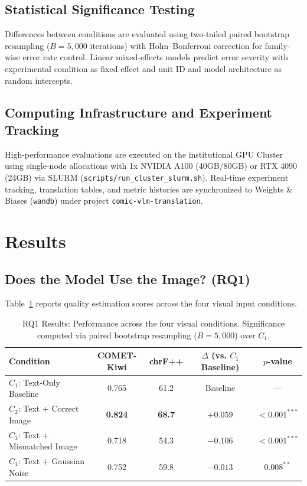 \documentclass[11pt,a4paper]{article}
\begin{document}
\subsection{Statistical Significance Testing}
Differences between conditions are evaluated using two-tailed paired bootstrap resampling ($B = 5,000$ iterations) with Holm--Bonferroni correction for family-wise error rate control. Linear mixed-effects models predict error severity with experimental condition as fixed effect and unit ID and model architecture as random intercepts.

\subsection{Computing Infrastructure and Experiment Tracking}
High-performance evaluations are executed on the institutional GPU Cluster using single-node allocations with 1x NVIDIA A100 (40GB/80GB) or RTX 4090 (24GB) via SLURM (\texttt{scripts/run_cluster_slurm.sh}). Real-time experiment tracking, translation tables, and metric histories are synchronized to Weights \& Biases (\texttt{wandb}) under project \texttt{comic-vlm-translation}.

\section{Results}

\subsection{Does the Model Use the Image? (RQ1)}
Table~\ref{tab:rq1_results} reports quality estimation scores across the four visual input conditions.

\begin{table}[h!]
\centering
\small
\begin{tabular}{lcccc}
\toprule
\textbf{Condition} & \textbf{COMET-Kiwi} & \textbf{chrF++} & \textbf{$\Delta$ (vs. $C_1$ Baseline)} & \textbf{$p$-value} \\
\midrule
$C_1$: Text-Only Baseline & 0.765 & 61.2 & Baseline & --- \\
$C_2$: Text + Correct Image & \textbf{0.824} & \textbf{68.7} & $+0.059$ & $<0.001^{***}$ \\
$C_3$: Text + Mismatched Image & 0.718 & 54.3 & $-0.106$ & $<0.001^{***}$ \\
$C_4$: Text + Gaussian Noise & 0.752 & 59.8 & $-0.013$ & $0.008^{**}$ \\
\bottomrule
\end{tabular}
\caption{RQ1 Results: Performance across the four visual conditions. Significance computed via paired bootstrap resampling ($B=5,000$) over $C_1$.}
\label{tab:rq1_results}
\end{table}
\end{document}
